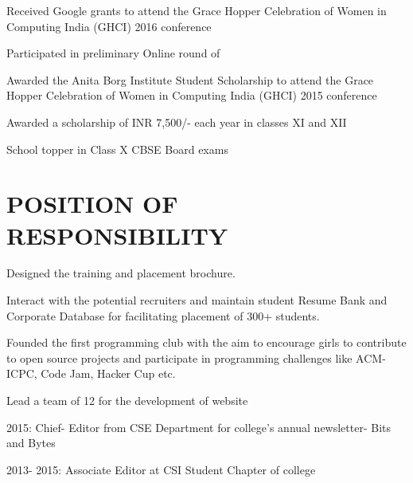 \documentclass[]{resume-openfont}
\begin{document}
\begin{minipage}[t]{0.68\textwidth}
\sectionsep
\sectionsep

\begin{tightemize}
\item {}
\item {}
\item Received Google grants to attend the Grace Hopper Celebration of Women in Computing India (GHCI) 2016 conference
\item Participated in preliminary Online round of 
\item Awarded the Anita Borg Institute Student Scholarship to attend the Grace Hopper Celebration of Women in Computing India (GHCI) 2015 conference
\item Awarded a scholarship of INR 7,500/-  each year in classes XI and XII
\item School topper in Class X CBSE Board exams
\end{tightemize}
\sectionsep


\section{POSITION OF RESPONSIBILITY}

\begin{tightemize}
\item Designed the training and placement brochure.
\item Interact with the potential recruiters and maintain student Resume Bank and Corporate Database for facilitating placement of 300+ students.
\end{tightemize}
\sectionsep

Founded the first programming club with the aim to encourage girls to contribute to open source projects and participate in programming challenges like ACM- ICPC, Code Jam, Hacker Cup etc.
\sectionsep

Lead a team of 12 for the development of website 
\sectionsep

\begin{tightemize}
\item 2015: Chief- Editor from CSE Department for college’s annual newsletter- Bits and Bytes
\item 2013- 2015: Associate Editor at CSI Student Chapter of college 
\end{tightemize}
\sectionsep

\end{minipage} 
\end{document}
